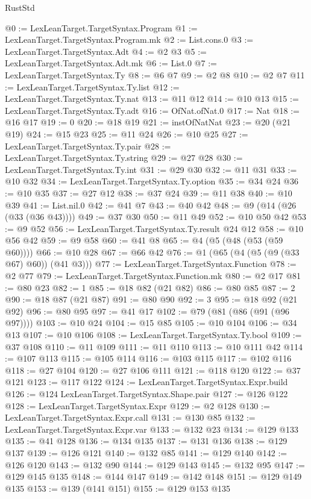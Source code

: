 \begin{lexlean}{RustStd}
\begin{coremodule}
@0 := LexLeanTarget.TargetSyntax.Program
@1 := LexLeanTarget.TargetSyntax.Program.mk
@2 := List.cons.{0}
@3 := LexLeanTarget.TargetSyntax.Adt
@4 := @2 @3
@5 := LexLeanTarget.TargetSyntax.Adt.mk
@6 := List.{0}
@7 := LexLeanTarget.TargetSyntax.Ty
@8 := @6 @7
@9 := @2 @8
@10 := @2 @7
@11 := LexLeanTarget.TargetSyntax.Ty.list
@12 := LexLeanTarget.TargetSyntax.Ty.nat
@13 := @11 @12
@14 := @10 @13
@15 := LexLeanTarget.TargetSyntax.Ty.adt
@16 := OfNat.ofNat.{0}
@17 := Nat
@18 := @16 @17
@19 := 0
@20 := @18 @19
@21 := instOfNatNat
@23 := @20 (@21 @19)
@24 := @15 @23
@25 := @11 @24
@26 := @10 @25
@27 := LexLeanTarget.TargetSyntax.Ty.pair
@28 := LexLeanTarget.TargetSyntax.Ty.string
@29 := @27 @28
@30 := LexLeanTarget.TargetSyntax.Ty.int
@31 := @29 @30
@32 := @11 @31
@33 := @10 @32
@34 := LexLeanTarget.TargetSyntax.Ty.option
@35 := @34 @24
@36 := @10 @35
@37 := @27 @12
@38 := @37 @24
@39 := @11 @38
@40 := @10 @39
@41 := List.nil.{0}
@42 := @41 @7
@43 := @40 @42
@48 := @9 (@14 (@26 (@33 (@36 @43))))
@49 := @37 @30
@50 := @11 @49
@52 := @10 @50 @42
@53 := @9 @52
@56 := LexLeanTarget.TargetSyntax.Ty.result @24 @12
@58 := @10 @56 @42
@59 := @9 @58
@60 := @41 @8
@65 := @4 (@5 (@48 (@53 (@59 @60))))
@66 := @10 @28
@67 := @66 @42
@76 := @1 (@65 (@4 (@5 (@9 (@33 @67) @60)) (@41 @3)))
@77 := LexLeanTarget.TargetSyntax.Function
@78 := @2 @77
@79 := LexLeanTarget.TargetSyntax.Function.mk
@80 := @2 @17
@81 := @80 @23
@82 := 1
@85 := @18 @82 (@21 @82)
@86 := @80 @85
@87 := 2
@90 := @18 @87 (@21 @87)
@91 := @80 @90
@92 := 3
@95 := @18 @92 (@21 @92)
@96 := @80 @95
@97 := @41 @17
@102 := @79 (@81 (@86 (@91 (@96 @97))))
@103 := @10 @24
@104 := @15 @85
@105 := @10 @104
@106 := @34 @13
@107 := @10 @106
@108 := LexLeanTarget.TargetSyntax.Ty.bool
@109 := @37 @108
@110 := @11 @109
@111 := @11 @110
@113 := @10 @111 @42
@114 := @107 @113
@115 := @105 @114
@116 := @103 @115
@117 := @102 @116
@118 := @27 @104
@120 := @27 @106 @111
@121 := @118 @120
@122 := @37 @121
@123 := @117 @122
@124 := LexLeanTarget.TargetSyntax.Expr.build
@126 := @124 LexLeanTarget.TargetSyntax.Shape.pair
@127 := @126 @122
@128 := LexLeanTarget.TargetSyntax.Expr
@129 := @2 @128
@130 := LexLeanTarget.TargetSyntax.Expr.call
@131 := @130 @85
@132 := LexLeanTarget.TargetSyntax.Expr.var
@133 := @132 @23
@134 := @129 @133
@135 := @41 @128
@136 := @134 @135
@137 := @131 @136
@138 := @129 @137
@139 := @126 @121
@140 := @132 @85
@141 := @129 @140
@142 := @126 @120
@143 := @132 @90
@144 := @129 @143
@145 := @132 @95
@147 := @129 @145 @135
@148 := @144 @147
@149 := @142 @148
@151 := @129 @149 @135
@153 := @139 (@141 @151)
@155 := @129 @153 @135

\end{coremodule}
\end{lexlean}
